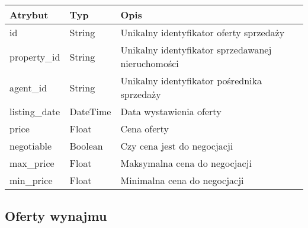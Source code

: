 \begin{table}[h]
    \centering
    \begin{tabular}{|l|l|l|}
    \hline
    \textbf{Atrybut} & \textbf{Typ} & \textbf{Opis} \\
    \hline
    id & String & Unikalny identyfikator oferty sprzedaży \\
    \hline
    property\_id & String & Unikalny identyfikator sprzedawanej nieruchomości \\
    \hline
    agent\_id & String & Unikalny identyfikator pośrednika sprzedaży \\
    \hline
    listing\_date & DateTime & Data wystawienia oferty \\
    \hline
    price & Float & Cena oferty \\
    \hline
    negotiable & Boolean & Czy cena jest do negocjacji \\
    \hline
    max\_price & Float & Maksymalna cena do negocjacji \\
    \hline
    min\_price & Float & Minimalna cena do negocjacji \\
    \hline
    \end{tabular}
    \label{tab:sell_offer_details}
\end{table}

\subsection{Oferty wynajmu}

